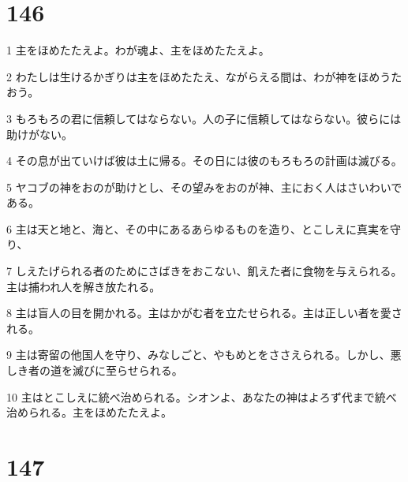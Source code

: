 \chapter{146}

\par 1 主をほめたたえよ。わが魂よ、主をほめたたえよ。
\par 2 わたしは生けるかぎりは主をほめたたえ、ながらえる間は、わが神をほめうたおう。
\par 3 もろもろの君に信頼してはならない。人の子に信頼してはならない。彼らには助けがない。
\par 4 その息が出ていけば彼は土に帰る。その日には彼のもろもろの計画は滅びる。
\par 5 ヤコブの神をおのが助けとし、その望みをおのが神、主におく人はさいわいである。
\par 6 主は天と地と、海と、その中にあるあらゆるものを造り、とこしえに真実を守り、
\par 7 しえたげられる者のためにさばきをおこない、飢えた者に食物を与えられる。主は捕われ人を解き放たれる。
\par 8 主は盲人の目を開かれる。主はかがむ者を立たせられる。主は正しい者を愛される。
\par 9 主は寄留の他国人を守り、みなしごと、やもめとをささえられる。しかし、悪しき者の道を滅びに至らせられる。
\par 10 主はとこしえに統べ治められる。シオンよ、あなたの神はよろず代まで統べ治められる。主をほめたたえよ。

\chapter{147}

